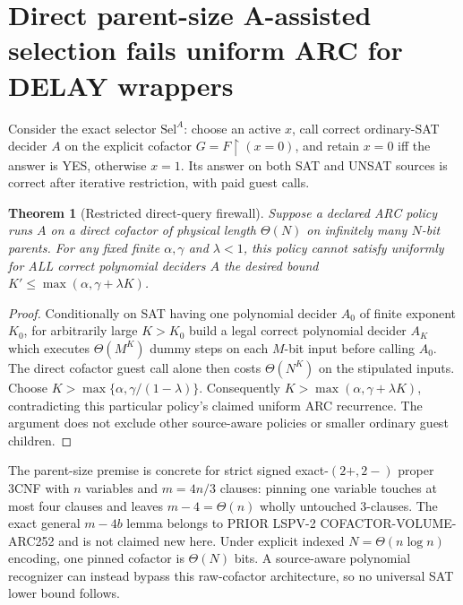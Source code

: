 \documentclass[11pt]{article}
\newtheorem{theorem}{Theorem}
\begin{document}
\section{Direct parent-size A-assisted selection fails uniform ARC for DELAY wrappers}
Consider the exact selector $\mathrm{Sel}^{A}$: choose an active $x$, call correct ordinary-SAT decider $A$ on the explicit cofactor $G=F\restriction(x=0)$, and retain $x=0$ iff the answer is YES, otherwise $x=1$. Its answer on both SAT and UNSAT sources is correct after iterative restriction, with paid guest calls.
\begin{theorem}[Restricted direct-query firewall]
Suppose a declared ARC policy runs $A$ on a direct cofactor of physical length $\Theta(N)$ on infinitely many $N$-bit parents. For any fixed finite $\alpha,\gamma$ and $\lambda<1$, this policy cannot satisfy uniformly for ALL correct polynomial deciders $A$ the desired bound $K'\le\max(\alpha,\gamma+\lambda K)$.
\end{theorem}
\begin{proof}
Conditionally on SAT having one polynomial decider $A_0$ of finite exponent $K_0$, for arbitrarily large $K>K_0$ build a legal correct polynomial decider $A_K$ which executes $\Theta(M^K)$ dummy steps on each $M$-bit input before calling $A_0$. The direct cofactor guest call alone then costs $\Theta(N^K)$ on the stipulated inputs. Choose $K>\max\{\alpha,\gamma/(1-\lambda)\}$. Consequently $K>\max(\alpha,\gamma+\lambda K)$, contradicting this particular policy's claimed uniform ARC recurrence. The argument does not exclude other source-aware policies or smaller ordinary guest children.
\end{proof}
The parent-size premise is concrete for strict signed exact-$(2+,2-)$ proper 3CNF with $n$ variables and $m=4n/3$ clauses: pinning one variable touches at most four clauses and leaves $m-4=\Theta(n)$ wholly untouched 3-clauses. The exact general $m-4b$ lemma belongs to PRIOR LSPV-2 COFACTOR-VOLUME-ARC252 and is not claimed new here. Under explicit indexed $N=\Theta(n\log n)$ encoding, one pinned cofactor is $\Theta(N)$ bits. A source-aware polynomial recognizer can instead bypass this raw-cofactor architecture, so no universal SAT lower bound follows.
\end{document}
